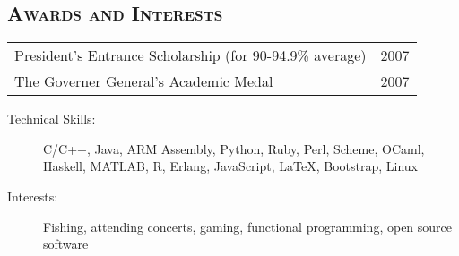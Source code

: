 \documentclass[letterpaper,11pt]{article}
\newcommand{\heading}[1]{
    \textsc{\textbf{#1}}
}
\newcommand*\resheading[1]{\subsection*{\heading{#1}}\vspace{0.3em}\nopagebreak[4]}
\begin{document}
\begin{minipage}{\textwidth}
\resheading{Awards and Interests}
	\begin{tabular*}{6.5in}{l@{\extracolsep{\fill}}r}
        President's Entrance Scholarship (for 90-94.9\% average) & 2007\\
		The Governer General's Academic Medal & 2007\\
\end{tabular*}
        \begin{description}
            \item[Technical Skills:]
                C/C++, Java, ARM Assembly, Python, Ruby, Perl, Scheme, OCaml, Haskell, MATLAB, 
                 R, Erlang, JavaScript, \LaTeX, Bootstrap, Linux
            \item[Interests:]
                Fishing, attending concerts, gaming, functional programming, open source software
        \end{description}
\end{minipage}
\end{document}
